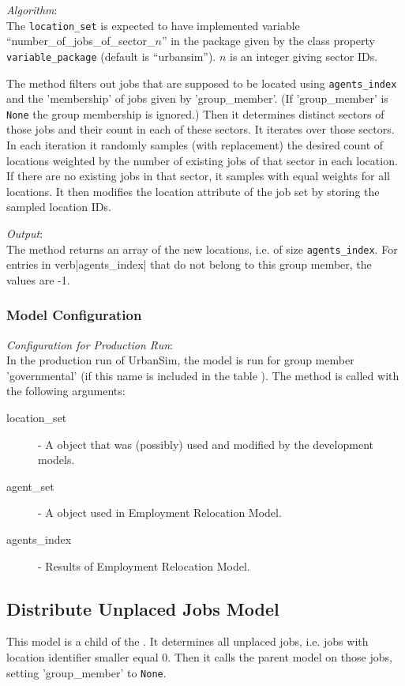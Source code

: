 {\it Algorithm}:~\\[1mm]
The \verb|location_set| is expected to have implemented variable
\variablesindex ``number_of_jobs_of_sector_$n$'' in the package
given by the class property \verb|variable_package| (default is
``urbansim'').  $n$ is an integer giving sector IDs.

The method filters out jobs that are supposed to be located using \verb|agents_index| and 
the 'membership' of jobs given by 'group_member'. (If 'group_member' is \verb|None| the group membership is ignored.)
Then it determines distinct sectors of those jobs and their count in each of
these sectors. It iterates over those sectors. In each iteration it
randomly samples (with replacement) the desired count of locations
weighted by the number of existing jobs of that sector in each
location. If there are no existing jobs in that sector, it samples
with equal weights for all locations.  It then modifies the location
attribute \attributesindex of the job set by storing the sampled
location IDs.

{\it Output}:~\\[1mm]
The method returns an array of the new locations, i.e. of size
\verb|agents_index|. For entries in verb|agents_index| that do not belong to this group member, the values are -1.

\subsubsection{Model Configuration}
\modelsindex
%
{\em Configuration for Production Run}:\\[1mm]
In the production run of UrbanSim, the model is run for group member 'governmental' (if this name is included
in the table ).
The  method is called with
the following arguments:
\begin{description}
\item[location_set] - A  object that was (possibly) used
  and modified by the development models. \modelsindex
\item[agent_set] - A  object used in Employment Relocation
  Model. \modelsindex
\item[agents_index] - Results of Employment Relocation Model. \modelsindex
\end{description}


\subsection{Distribute Unplaced Jobs Model}
\modelsindex
%
\label{sec:distribute-unplaced-jobs-model} 
%
This model is a child of the . It determines all unplaced jobs, i.e.
 jobs with location identifier smaller equal 0. Then it calls the parent model on those jobs, setting 
 'group_member' to \verb|None|.

